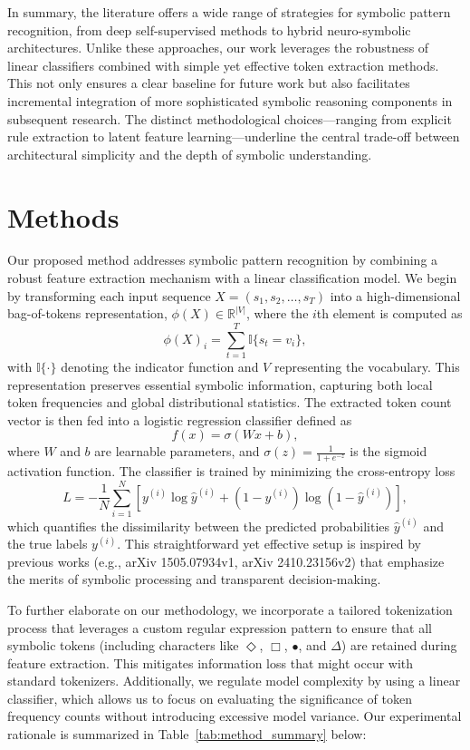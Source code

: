 \documentclass{article}
\begin{document}
In summary, the literature offers a wide range of strategies for symbolic pattern recognition, from deep self-supervised methods to hybrid neuro-symbolic architectures. Unlike these approaches, our work leverages the robustness of linear classifiers combined with simple yet effective token extraction methods. This not only ensures a clear baseline for future work but also facilitates incremental integration of more sophisticated symbolic reasoning components in subsequent research. The distinct methodological choices—ranging from explicit rule extraction to latent feature learning—underline the central trade-off between architectural simplicity and the depth of symbolic understanding.

\section{Methods}
Our proposed method addresses symbolic pattern recognition by combining a robust feature extraction mechanism with a linear classification model. We begin by transforming each input sequence \( X = (s_1, s_2, \dots, s_T) \) into a high-dimensional bag-of-tokens representation, \(\phi(X) \in \mathbb{R}^{|V|}\), where the \(i\)th element is computed as  
\[
\phi(X)_i = \sum_{t=1}^{T} \mathbb{I}\{ s_t = v_i \},
\]
with \(\mathbb{I}\{\cdot\}\) denoting the indicator function and \(V\) representing the vocabulary. This representation preserves essential symbolic information, capturing both local token frequencies and global distributional statistics. The extracted token count vector is then fed into a logistic regression classifier defined as  
\[
f(x) = \sigma(W x + b),
\]
where \(W\) and \(b\) are learnable parameters, and \(\sigma(z) = \frac{1}{1+e^{-z}}\) is the sigmoid activation function. The classifier is trained by minimizing the cross-entropy loss  
\[
L = -\frac{1}{N}\sum_{i=1}^{N} \left[y^{(i)} \log \hat{y}^{(i)} + (1-y^{(i)}) \log (1-\hat{y}^{(i)})\right],
\]
which quantifies the dissimilarity between the predicted probabilities \(\hat{y}^{(i)}\) and the true labels \(y^{(i)}\). This straightforward yet effective setup is inspired by previous works (e.g., arXiv 1505.07934v1, arXiv 2410.23156v2) that emphasize the merits of symbolic processing and transparent decision-making.

To further elaborate on our methodology, we incorporate a tailored tokenization process that leverages a custom regular expression pattern to ensure that all symbolic tokens (including characters like \(\Diamond\), \(\Box\), \(\bullet\), and \(\Delta\)) are retained during feature extraction. This mitigates information loss that might occur with standard tokenizers. Additionally, we regulate model complexity by using a linear classifier, which allows us to focus on evaluating the significance of token frequency counts without introducing excessive model variance. Our experimental rationale is summarized in Table~\ref{tab:method_summary} below:
\end{document}
